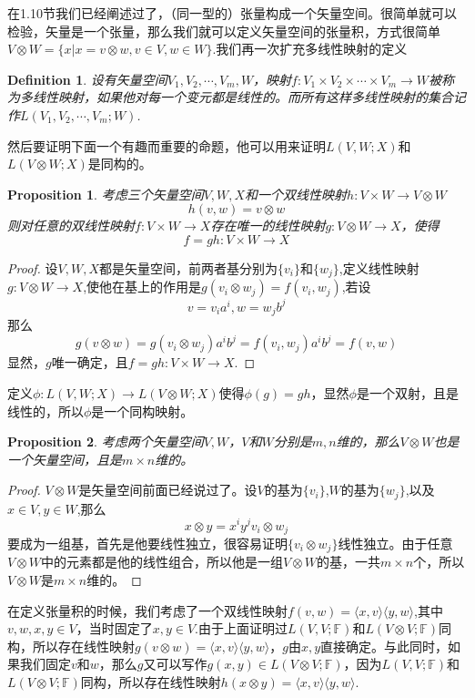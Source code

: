 \documentclass[11pt,a4paper,openany]{book}%
\theoremstyle{plain}%
\newtheorem{pro}{Proposition}[chapter]%
\newtheorem{defi}{Definition}[chapter]%
\begin{document}
在1.10节我们已经阐述过了，（同一型的）张量构成一个矢量空间。很简单就可以检验，矢量是一个张量，那么我们就可以定义矢量空间的张量积，方式很简单
$V\otimes W=\{x|x=v\otimes w,v\in V,w \in W\}$.我们再一次扩充多线性映射的定义
\begin{defi}
设有矢量空间$V_1,V_2,\cdots,V_m,W$，映射$f:V_1\times V_2\times \cdots \times V_m\rightarrow W$被称为多线性映射，如果他对每一个变元都是线性的。而所有这样多线性映射的集合记作$L(V_1,V_2,\cdots,V_m;W)$.
\end{defi}
然后要证明下面一个有趣而重要的命题，他可以用来证明$L(V,W;X)$和$L(V\otimes W;X)$是同构的。
\begin{pro}
考虑三个矢量空间$V,W,X$和一个双线性映射$h:V\times W\rightarrow V\otimes W$
\[
h(v,w)=v\otimes w
\]
则对任意的双线性映射$f:V\times W\rightarrow X$存在唯一的线性映射$g:V\otimes W\rightarrow X$，使得
\[
f=gh:V\times W\rightarrow X
\]
\end{pro}
\begin{proof}
设$V,W,X$都是矢量空间，前两者基分别为$\{v_i\}$和$\{w_j\}$,定义线性映射$g:V\otimes W\rightarrow X$,使他在基上的作用是$g(v_i\otimes w_j)=f(v_i,w_j)$,若设
\[
v=v_ia^i,w=w_jb^j
\]
那么
\[
g(v\otimes w)=g(v_i\otimes w_j)a^ib^j=f(v_i,w_j)a^ib^j=f(v,w)
\]
显然，$g$唯一确定，且$f=gh:V\times W\rightarrow X$.
\end{proof}
定义$\phi:L(V,W;X)\rightarrow L(V\otimes W;X)$使得$\phi(g)=gh$，显然$\phi$是一个双射，且是线性的，所以$\phi$是一个同构映射。
\begin{pro}
考虑两个矢量空间$V,W$，$V$和$W$分别是$m,n$维的，那么$V\otimes W$也是一个矢量空间，且是$m\times n$维的。
\end{pro}
\begin{proof}
$V\otimes W$是矢量空间前面已经说过了。设$V$的基为$\{v_i\}$,$W$的基为$\{w_j\}$,以及$x\in V,y\in W$,那么
\[
x\otimes y=x^iy^jv_i \otimes w_j
\]
要成为一组基，首先是他要线性独立，很容易证明$\{v_i \otimes w_j\}$线性独立。由于任意$V\otimes W$中的元素都是他的线性组合，所以他是一组$V\otimes W$的基，一共$m\times n$个，所以$V\otimes W$是$m\times n$维的。
\end{proof}

\indent 在定义张量积的时候，我们考虑了一个双线性映射$f(v,w)=\langle x,v \rangle \langle y,w \rangle$,其中$v,w,x,y\in V$，当时固定了$x,y\in V$.由于上面证明过$L(V,V;\mathbb{F})$和$L(V\otimes V;\mathbb{F})$同构，所以存在线性映射$g(v\otimes w)=\langle x,v \rangle \langle y,w \rangle$，$g$由$x,y$直接确定。与此同时，如果我们固定$v$和$w$，那么$g$又可以写作$g(x,y)\in L(V\otimes V;\mathbb{F})$，因为$L(V,V;\mathbb{F})$和$L(V\otimes V;\mathbb{F})$同构，所以存在线性映射$h(x\otimes y)=\langle x,v \rangle \langle y,w\rangle$.
\end{document}
